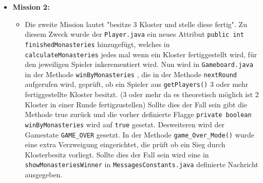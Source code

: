 \begin{itemize}
\item \textbf{Mission 2:}
	\begin{itemize}
	\item[]
		Die zweite Mission lautet "besitze 3 Kloster und stelle diese fertig". Zu diesem Zweck wurde der 	
		\texttt{Player.java}  ein neues Attribut \texttt{public int finishedMonasteries} hinzugefügt, 
		welches in 	\\
		\texttt{calculateMonasteries} jedes mal wenn ein Kloster fertiggestellt wird,
		für den jeweiligen Spieler inkerementiert wird. 
		Nun wird in \texttt{Gameboard.java} in der Methode \texttt{winByMonasteries}
		, die in der Methode \texttt{nextRound} aufgerufen 
		wird, geprüft, ob ein Spieler aus
		\texttt{getPlayers()} 3 oder mehr fertiggestellte Kloster besitzt.
		(3 oder mehr da es theoretisch möglich ist 2 	
		Kloster in einer Runde fertigzustellen) 
		Sollte dies der Fall sein gibt die Methode true zurück und die vorher definierte Flagge 
		\texttt{private boolean winByMonasteries} wird auf \texttt{true} gesetzt.
		Desweiteren wird der Gamestate \texttt{GAME\_OVER} gesetzt.
		In der Methode \texttt{game\_Over\_Mode()}  wurde eine extra Verzweigung eingerichtet, die prüft ob ein 
		Sieg durch Klosterbesitz vorliegt.
		Sollte dies der Fall sein wird eine in \texttt{showMonasteriesWinner} 
		in \texttt{MessagesConstants.java} definierte 
		Nachricht ausgegeben.
	\end{itemize}

\end{itemize}

\clearpage

